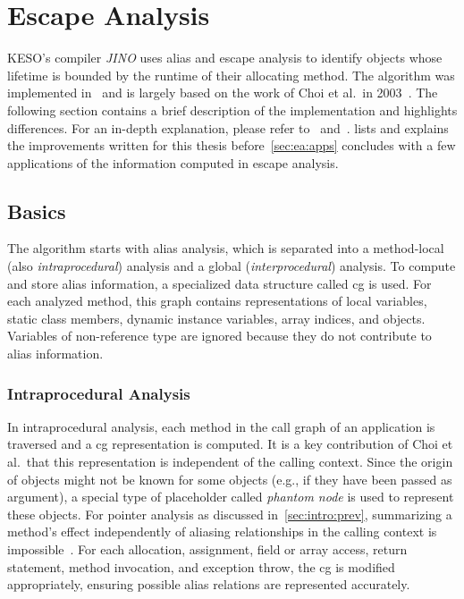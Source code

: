 
\chapter{Escape Analysis}
	\label{chapter:ea}
	KESO's compiler \emph{JINO} uses alias and escape analysis to identify objects whose lifetime is bounded by the
	runtime of their allocating method. The algorithm was implemented in~\cite{lang:12} and is largely based on the work
	of Choi et al.\ in 2003~\cite{choi:03:toplas}. The following section contains a brief description of the
	implementation and highlights differences. For an in-depth explanation, please refer to~\cite{lang:12}
	and~\cite{choi:03:toplas}.  lists and explains the improvements written for this thesis
	before~\cref{sec:ea:apps} concludes with a few applications of the information computed in escape analysis.

	\section{Basics}
		\label{sec:ea:basics}
		The algorithm starts with alias analysis, which is separated into a method-local (also \emph{intraprocedural})
		analysis and a global (\emph{interprocedural}) analysis. To compute and store alias information, a specialized data
		structure called \gls{cg} is used. For each analyzed method, this graph contains representations of local variables,
		static class members, dynamic instance variables, array indices, and objects. Variables of non-reference type are
		ignored because they do not contribute to alias information.

		\subsection{Intraprocedural Analysis}
			\label{sub:ea:basics:local}
			In intraprocedural analysis, each method in the call graph of an application is traversed and a \gls{cg}
			representation is computed. It is a key contribution of Choi et al.\ that this representation is independent of
			the calling context. Since the origin of objects might not be known for some objects (e.g., if they have been
			passed as argument), a special type of placeholder called \emph{phantom node} is used to represent these objects.
			For pointer analysis as discussed in~\cref{sec:intro:prev}, summarizing a method's effect independently of
			aliasing relationships in the calling context is impossible~\cite[p.~886]{choi:03:toplas}. For each allocation,
			assignment, field or array access, return statement, method invocation, and exception throw, the \gls{cg} is
			modified appropriately, ensuring possible alias relations are represented accurately.

